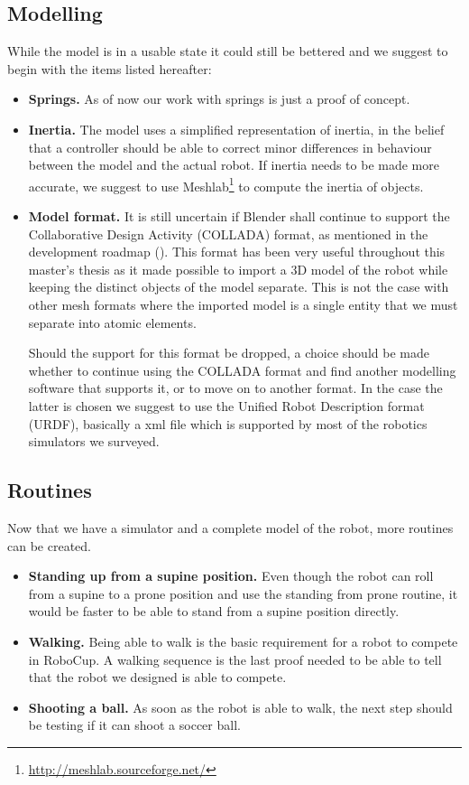 \subsection{Modelling}
While the model is in a usable state it could still be bettered and we suggest to begin with the items listed hereafter:
\begin{itemize}
\item \textbf{Springs.} As of now our work with springs is just a proof of concept.

\item \textbf{Inertia.} The model uses a simplified representation of inertia, in the belief that a controller should be able to correct minor differences in behaviour between the model and the actual robot. If inertia needs to be made more accurate, we suggest to use Meshlab\footnote{\url{http://meshlab.sourceforge.net/}} to compute the inertia of objects.

\item \textbf{Model format.} It is still uncertain if Blender shall continue to support the Collaborative Design Activity (COLLADA) format, as mentioned in the development roadmap (\cite{blender_roadmap}). This format has been very useful throughout this master's thesis as it made possible to import a 3D model of the robot while keeping the distinct objects of the model separate. This is not the case with other mesh formats where the imported model is a single entity that we must separate into atomic elements. 

Should the support for this format be dropped, a choice should be made whether to continue using the COLLADA format and find another modelling software that supports it, or to move on to another format. In the case the latter is chosen we suggest to use the Unified Robot Description format (URDF), basically a xml file which is supported by most of the robotics simulators we surveyed.

\end{itemize}

\subsection{Routines}
Now that we have a simulator and a complete model of the robot, more routines can be created. 
\begin{itemize}
\item \textbf{Standing up from a supine position.} Even though the robot can roll from a supine to a prone position and use the standing from prone routine, it would be faster to be able to stand from a supine position directly.

\item \textbf{Walking.} Being able to walk is the basic requirement for a robot to compete in RoboCup. A walking sequence is the last proof needed to be able to tell that the robot we designed is able to compete.

\item \textbf{Shooting a ball.} As soon as the robot is able to walk, the next step should be testing if it can shoot a soccer ball.
\end{itemize}

